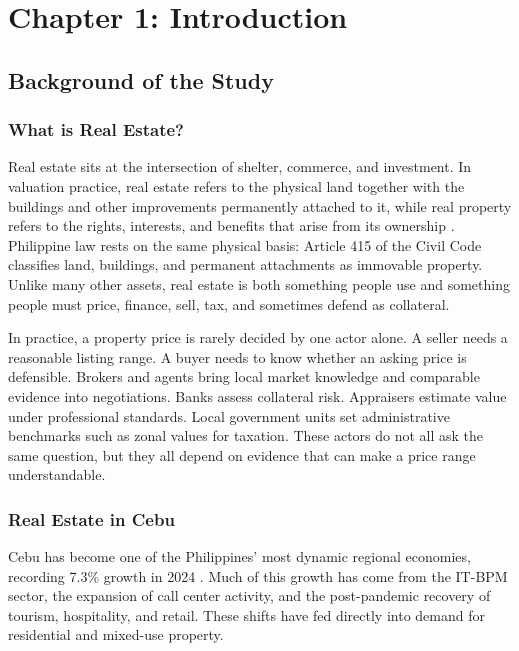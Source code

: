 \section{Chapter 1: Introduction}\label{introduction}

\subsection{Background of the Study}\label{background-of-the-study}

\subsubsection{What is Real Estate?}\label{what-is-real-estate}

Real estate sits at the intersection of shelter, commerce, and investment. In valuation practice, real estate refers to the physical land together with the buildings and other improvements permanently attached to it, while real property refers to the rights, interests, and benefits that arise from its ownership \parencite{ivs2025}. Philippine law rests on the same physical basis: Article 415 of the Civil Code classifies land, buildings, and permanent attachments as immovable property. Unlike many other assets, real estate is both something people use and something people must price, finance, sell, tax, and sometimes defend as collateral.

In practice, a property price is rarely decided by one actor alone. A seller needs a reasonable listing range. A buyer needs to know whether an asking price is defensible. Brokers and agents bring local market knowledge and comparable evidence into negotiations. Banks assess collateral risk. Appraisers estimate value under professional standards. Local government units set administrative benchmarks such as zonal values for taxation. These actors do not all ask the same question, but they all depend on evidence that can make a price range understandable.

\subsubsection{Real Estate in Cebu}\label{real-estate-in-cebu}

Cebu has become one of the Philippines' most dynamic regional economies, recording 7.3\% growth in 2024 \parencite{psa_cebu2025}. Much of this growth has come from the IT-BPM sector, the expansion of call center activity, and the post-pandemic recovery of tourism, hospitality, and retail. These shifts have fed directly into demand for residential and mixed-use property.

